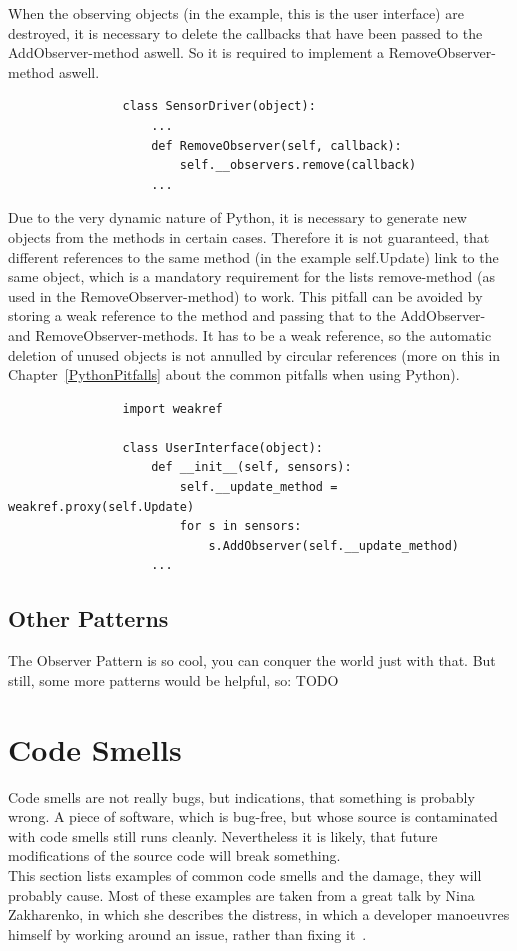 			When the observing objects (in the example, this is the user interface) are destroyed, it is necessary to delete the callbacks that have been passed to the AddObserver-method aswell.
			So it is required to implement a RemoveObserver-method aswell.
			\begin{verbatim}
				class SensorDriver(object):
					...
					def RemoveObserver(self, callback):
						self.__observers.remove(callback)
					...
			\end{verbatim}
			Due to the very dynamic nature of Python, it is necessary to generate new objects from the methods in certain cases.
			Therefore it is not guaranteed, that different references to the same method (in the example self.Update) link to the same object, which is a mandatory requirement for the lists remove-method (as used in the RemoveObserver-method) to work.
			This pitfall can be avoided by storing a weak reference to the method and passing that to the AddObserver- and RemoveObserver-methods.
			It has to be a weak reference, so the automatic deletion of unused objects is not annulled by circular references (more on this in Chapter~\ref{PythonPitfalls} about the common pitfalls when using Python).
			\begin{verbatim}
				import weakref

				class UserInterface(object):
					def __init__(self, sensors):
						self.__update_method = weakref.proxy(self.Update)
						for s in sensors:
							s.AddObserver(self.__update_method)
					...
			\end{verbatim}


		\subsection{Other Patterns}
			The Observer Pattern is so cool, you can conquer the world just with that.
			But still, some more patterns would be helpful, so: TODO


	\section{Code Smells}
		Code smells are not really bugs, but indications, that something is probably wrong.
		A piece of software, which is bug-free, but whose source is contaminated with code smells still runs cleanly.
		Nevertheless it is likely, that future modifications of the source code will break something.\\
		This section lists examples of common code smells and the damage, they will probably cause.
		Most of these examples are taken from a great talk by Nina Zakharenko, in which she describes the distress, in which a developer manoeuvres himself by working around an issue, rather than fixing it~\cite{Zakharenko}.

